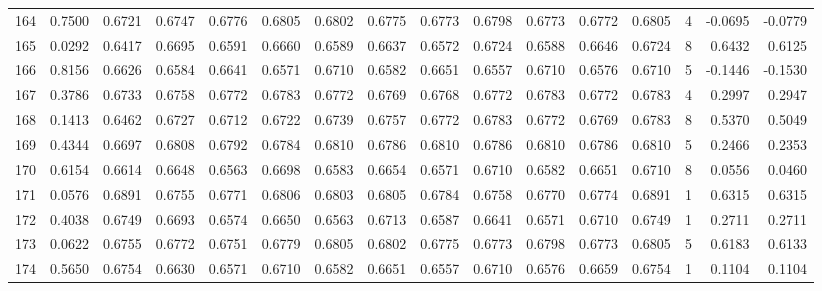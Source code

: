 \begin{tabular}{lrrrrrrrrrrrrrrr}
164 &      0.7500 &  0.6721 &  0.6747 &  0.6776 &  0.6805 &  0.6802 &  0.6775 &  0.6773 &  0.6798 &  0.6773 &   0.6772 &     0.6805 &      4 &                   -0.0695 &                    -0.0779 \\
165 &      0.0292 &  0.6417 &  0.6695 &  0.6591 &  0.6660 &  0.6589 &  0.6637 &  0.6572 &  0.6724 &  0.6588 &   0.6646 &     0.6724 &      8 &                    0.6432 &                     0.6125 \\
166 &      0.8156 &  0.6626 &  0.6584 &  0.6641 &  0.6571 &  0.6710 &  0.6582 &  0.6651 &  0.6557 &  0.6710 &   0.6576 &     0.6710 &      5 &                   -0.1446 &                    -0.1530 \\
167 &      0.3786 &  0.6733 &  0.6758 &  0.6772 &  0.6783 &  0.6772 &  0.6769 &  0.6768 &  0.6772 &  0.6783 &   0.6772 &     0.6783 &      4 &                    0.2997 &                     0.2947 \\
168 &      0.1413 &  0.6462 &  0.6727 &  0.6712 &  0.6722 &  0.6739 &  0.6757 &  0.6772 &  0.6783 &  0.6772 &   0.6769 &     0.6783 &      8 &                    0.5370 &                     0.5049 \\
169 &      0.4344 &  0.6697 &  0.6808 &  0.6792 &  0.6784 &  0.6810 &  0.6786 &  0.6810 &  0.6786 &  0.6810 &   0.6786 &     0.6810 &      5 &                    0.2466 &                     0.2353 \\
170 &      0.6154 &  0.6614 &  0.6648 &  0.6563 &  0.6698 &  0.6583 &  0.6654 &  0.6571 &  0.6710 &  0.6582 &   0.6651 &     0.6710 &      8 &                    0.0556 &                     0.0460 \\
171 &      0.0576 &  0.6891 &  0.6755 &  0.6771 &  0.6806 &  0.6803 &  0.6805 &  0.6784 &  0.6758 &  0.6770 &   0.6774 &     0.6891 &      1 &                    0.6315 &                     0.6315 \\
172 &      0.4038 &  0.6749 &  0.6693 &  0.6574 &  0.6650 &  0.6563 &  0.6713 &  0.6587 &  0.6641 &  0.6571 &   0.6710 &     0.6749 &      1 &                    0.2711 &                     0.2711 \\
173 &      0.0622 &  0.6755 &  0.6772 &  0.6751 &  0.6779 &  0.6805 &  0.6802 &  0.6775 &  0.6773 &  0.6798 &   0.6773 &     0.6805 &      5 &                    0.6183 &                     0.6133 \\
174 &      0.5650 &  0.6754 &  0.6630 &  0.6571 &  0.6710 &  0.6582 &  0.6651 &  0.6557 &  0.6710 &  0.6576 &   0.6659 &     0.6754 &      1 &                    0.1104 &                     0.1104 \\

\end{tabular}
